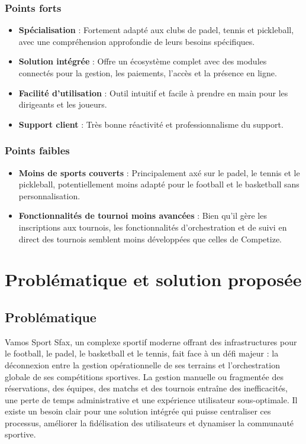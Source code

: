 \documentclass{article}
\begin{document}
\subsubsection{Points forts}
\begin{itemize}
    \item \textbf{Spécialisation} : Fortement adapté aux clubs de padel, tennis et pickleball, avec une compréhension approfondie de leurs besoins spécifiques.
    \item \textbf{Solution intégrée} : Offre un écosystème complet avec des modules connectés pour la gestion, les paiements, l'accès et la présence en ligne.
    \item \textbf{Facilité d'utilisation} : Outil intuitif et facile à prendre en main pour les dirigeants et les joueurs.
    \item \textbf{Support client} : Très bonne réactivité et professionnalisme du support.
\end{itemize}

\subsubsection{Points faibles}
\begin{itemize}
    \item \textbf{Moins de sports couverts} : Principalement axé sur le padel, le tennis et le pickleball, potentiellement moins adapté pour le football et le basketball sans personnalisation.
    \item \textbf{Fonctionnalités de tournoi moins avancées} : Bien qu'il gère les inscriptions aux tournois, les fonctionnalités d'orchestration et de suivi en direct des tournois semblent moins développées que celles de Competize.
\end{itemize}

\section{Problématique et solution proposée}

\subsection{Problématique}

Vamos Sport Sfax, un complexe sportif moderne offrant des infrastructures pour le football, le padel, le basketball et le tennis, fait face à un défi majeur : la déconnexion entre la gestion opérationnelle de ses terrains et l'orchestration globale de ses compétitions sportives. La gestion manuelle ou fragmentée des réservations, des équipes, des matchs et des tournois entraîne des inefficacités, une perte de temps administrative et une expérience utilisateur sous-optimale. Il existe un besoin clair pour une solution intégrée qui puisse centraliser ces processus, améliorer la fidélisation des utilisateurs et dynamiser la communauté sportive.
\end{document}
